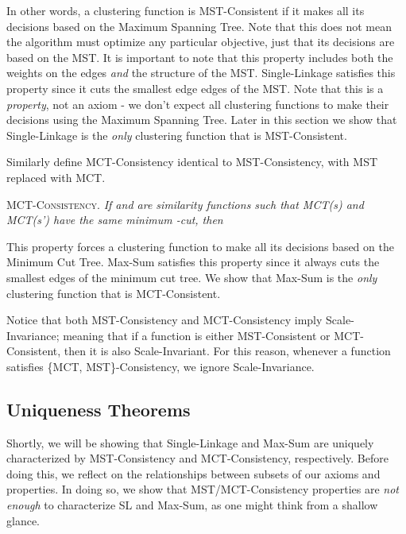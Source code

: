 \documentclass[twoside,11pt]{article}
\begin{document}
In other words, a clustering function is MST-Consistent if it makes all its decisions based on the Maximum Spanning Tree. Note that this does not mean the algorithm must optimize any particular objective, just that its decisions are based on the MST. It is important to note that this property includes both the weights on the edges \textit{and} the structure of the MST. Single-Linkage satisfies this property since it cuts the smallest edge  edges of the MST. Note that this is a \textit{property}, not an axiom - we don't expect all clustering functions to make their decisions using the Maximum Spanning Tree. Later in this section we show that Single-Linkage is the \textit{only} clustering function that is MST-Consistent.

Similarly define MCT-Consistency identical to MST-Consistency, with MST replaced with MCT.

\begin{center}
\textsc{MCT-Consistency.} \textit{If  and  are similarity functions such that MCT(s) and MCT(s') have the same minimum -cut, then }
\end{center}

This property forces a clustering function to make all its decisions based on the Minimum Cut Tree. Max-Sum satisfies this property since it always cuts the smallest  edges of the minimum cut tree. We show that Max-Sum is the \textit{only} clustering function that is MCT-Consistent.

Notice that both MST-Consistency and MCT-Consistency imply Scale-Invariance; meaning that if a function is either MST-Consistent or MCT-Consistent, then it is also Scale-Invariant. For this reason, whenever a function satisfies \{MCT, MST\}-Consistency, we ignore Scale-Invariance.

\subsection{Uniqueness Theorems}

Shortly, we will be showing that Single-Linkage and Max-Sum are uniquely characterized by MST-Consistency and MCT-Consistency, respectively. Before doing this, we reflect on the relationships between subsets of our axioms and properties. In doing so, we show that MST/MCT-Consistency properties are \textit{not enough} to characterize SL and Max-Sum, as one might think from a shallow glance. 
\end{document}
